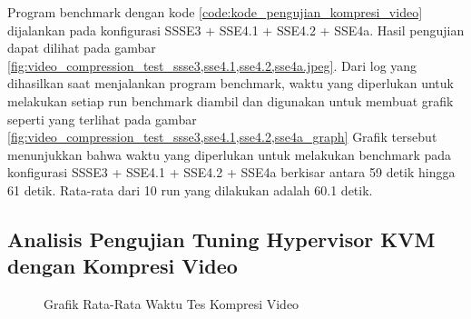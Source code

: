 Program benchmark dengan kode \ref{code:kode_pengujian_kompresi_video} dijalankan pada konfigurasi SSSE3 + SSE4.1 + SSE4.2 + SSE4a. Hasil pengujian dapat dilihat pada gambar \ref{fig:video_compression_test_ssse3,sse4.1,sse4.2,sse4a.jpeg}. Dari log yang dihasilkan saat menjalankan program benchmark, waktu yang diperlukan untuk melakukan setiap run benchmark diambil dan digunakan untuk membuat grafik seperti yang terlihat pada gambar \ref{fig:video_compression_test_ssse3,sse4.1,sse4.2,sse4a_graph} Grafik tersebut menunjukkan bahwa waktu yang diperlukan untuk melakukan benchmark pada konfigurasi SSSE3 + SSE4.1 + SSE4.2 + SSE4a berkisar antara 59 detik hingga 61 detik. Rata-rata dari 10 run yang dilakukan adalah 60.1 detik.

\subsection{Analisis Pengujian Tuning Hypervisor KVM dengan Kompresi Video}
\begin{figure}
    \centering
    \caption{Grafik Rata-Rata Waktu Tes Kompresi Video}
    \label{fig:video_compression_test_graph}
\end{figure}

